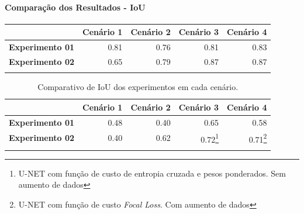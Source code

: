 \documentclass[%
  10pt,%
  aspectratio = 169,%
  compress,%
  t,%
  english,%
  brazilian,%
  tikz,
]{beamer}
\begin{document}
\begin{frame}
    \setcounter{footnote}{0}
    \framesubtitle{Comparação dos Resultados - IoU}
    
    \textcolor{gray!25}{
    \begin{table}[!ht]
        \centering
        \begin{tabular}{lrrrr}
        \toprule
            \textbf{} & \textbf{Cenário 1} & \textbf{Cenário 2} & \textbf{Cenário 3} & \textbf{Cenário 4} \\
            \midrule
            \textbf{Experimento 01}  & 0.81 & 0.76 & 0.81 & 0.83 \\ 
            \textbf{Experimento 02}  & 0.65 & 0.79 & \colorbox{green!25}{0.87} & \colorbox{green!25}{0.87} \\
            \bottomrule
            \addlinespace
        \end{tabular}
    \end{table}}
    
    \begin{table}[!ht]
        \centering
        \caption{Comparativo de IoU dos experimentos em cada cenário.}%
        \label{tab:res:iou}%
        \begin{tabular}{lrrrr}
        \toprule
            \textbf{} & \textbf{Cenário 1} & \textbf{Cenário 2} & \textbf{Cenário 3} & \textbf{Cenário 4} \\
            \midrule
            \textbf{Experimento 01}  & 0.48 & 0.40 & 0.65 & 0.58 \\ 
            \textbf{Experimento 02}  & 0.40 & 0.62 & \colorbox{green!25}{0.72}\footnote{U-NET com função de custo de entropia cruzada e pesos ponderados. Sem aumento de dados} & \colorbox{green!25}{0.71}\footnote{U-NET com função de custo \textit{Focal Loss}. Com aumento de dados} \\
            \bottomrule
            \addlinespace
        \end{tabular}
    \end{table}
    
\end{frame}
\end{document}
